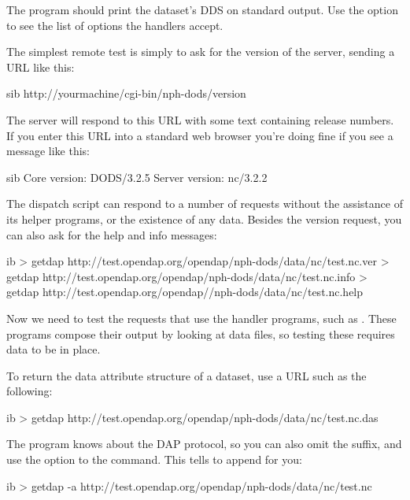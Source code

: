 \documentclass{dods-book}
\begin{document}
The program should print the dataset's DDS on standard output. Use the
 option to see the list of options the handlers accept.

The simplest remote test is simply to ask for the version of
the server, sending a URL like this:

\begin{vcode}{sib}
http://yourmachine/cgi-bin/nph-dods/version
\end{vcode}

The server will respond to this URL with some text containing release
numbers. If you enter this URL into a standard web browser you're
doing fine if you see a message like this:

\begin{vcode}{sib}
Core version: DODS/3.2.5
Server version: nc/3.2.2
\end{vcode}

The dispatch script can respond to a number of requests without the
assistance of its helper programs, or the existence of any data.
Besides the version request, you can also ask for the help and info
messages:

\begin{vcode}{ib}
> getdap http://test.opendap.org/opendap/nph-dods/data/nc/test.nc.ver
> getdap http://test.opendap.org/opendap/nph-dods/data/nc/test.nc.info
> getdap http://test.opendap.org/opendap//nph-dods/data/nc/test.nc.help
\end{vcode}

Now we need to test the requests that use the handler programs, such
as . These programs compose their output by
looking at data files, so testing these requires data to be in place.

To return the data attribute structure of a dataset, use a URL such as
the following:

\begin{vcode}{ib}
> getdap http://test.opendap.org/opendap/nph-dods/data/nc/test.nc.das
\end{vcode}

The  program knows about the DAP protocol, so you can
also omit the  suffix, and use the  option to the
 command.  This tells  to append 
for you:

\begin{vcode}{ib}
> getdap -a http://test.opendap.org/opendap/nph-dods/data/nc/test.nc
\end{vcode}
\end{document}
